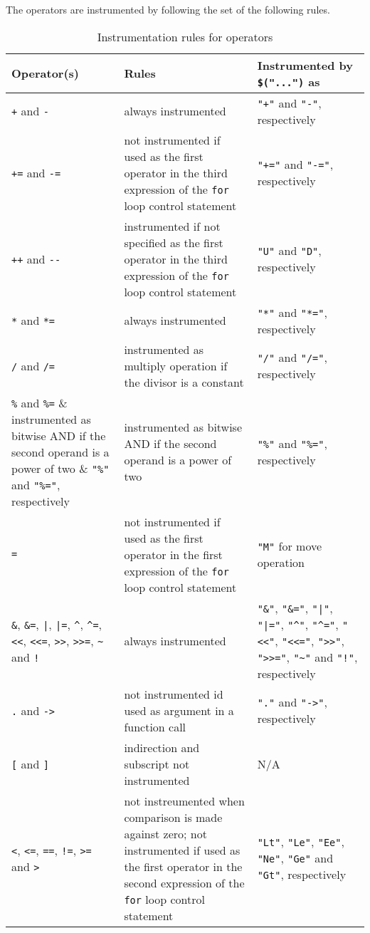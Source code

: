 The operators are instrumented by following the set of the following rules.

\begin{table}[!hb]
\centering\small
\caption{Instrumentation rules for operators}
\begin{tabular}{|p{}<{\raggedright}|p{}<{\raggedright}|p{}<{\raggedright}|} 
\hline
\textbf{Operator(s)} & \textbf{Rules} & \textbf{Instrumented by} \verb|$("...")| \textbf{as} \\
\hline
\verb|+| and \verb|-| & always instrumented & \verb|"+"| and \verb|"-"|, respectively \\
\hline
\verb|+=| and \verb|-=| & not instrumented if used as the first operator in the third expression of the \verb|for| loop control statement & \verb|"+="| and \verb|"-="|, respectively \\
\hline
\verb|++| and \verb|--| & instrumented if not specified as the first operator in the third expression of the \verb|for| loop control statement & \verb|"U"| and \verb|"D"|, respectively \\
\hline
\verb|*| and \verb|*=| & always instrumented & \verb|"*"| and \verb|"*="|, respectively \\
\hline
\verb|/| and \verb|/=| & instrumented as multiply operation if the divisor is a constant & \verb|"/"| and \verb|"/="|, respectively \\
\hline
\verb|%| and \verb|%=| & instrumented as bitwise AND if the second operand is a power of two & \verb|"%"| and \verb|"%="|, respectively \\
\hline
\verb|=| & not instrumented if used as the first operator in the first expression of the \verb|for| loop control statement & \verb|"M"| for move operation \\
\hline
\verb|&|, \verb|&=|, \verb$|$, \verb$|=$, \verb|^|, \verb|^=|, \verb|<<|, \verb|<<=|, \verb|>>|, \verb|>>=|, \verb|~| and \verb|!| & always instrumented & \verb|"&"|, \verb|"&="|, \verb$"|"$, \verb$"|="$, \verb|"^"|, \verb|"^="|, \verb|"<<"|, \verb|"<<="|, \verb|">>"|, \verb|">>="|, \verb|"~"| and \verb|"!"|, respectively \\
\hline
\verb|.| and \verb|->| & not instrumented id used as argument in a function call & \verb|"."| and \verb|"->"|, respectively \\
\hline
\verb|[| and \verb|]| & indirection and subscript not instrumented & N/A \\
\hline
\verb|<|, \verb|<=|, \verb|==|, \verb|!=|, \verb|>=| and \verb|>| & not instreumented when comparison is made against zero; not instrumented if used as the first operator in the second expression of the \verb|for| loop control statement & \verb|"Lt"|, \verb|"Le"|, \verb|"Ee"|, \verb|"Ne"|, \verb|"Ge"| and \verb|"Gt"|, respectively \\
\hline
\end{tabular}
\label{tab:instrumentation_rules_operators}
\end{table}

